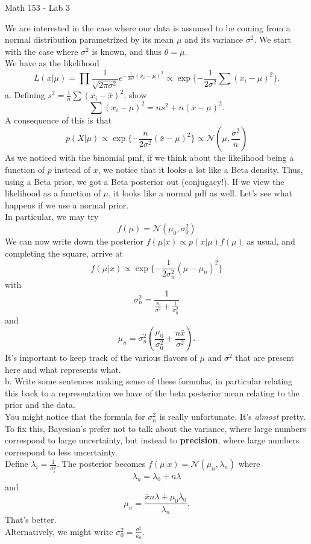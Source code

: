 \documentclass{article}
\begin{document}
\centerline{Math 153 - Lab 3}
\vspace{.1in}
We are interested in the case where our data is assumed to be coming from a normal distribution parametrized by its mean $\mu$ and its variance $\sigma^2$.  We start with the case where $\sigma^2$ is known, and thus $\theta=\mu$.\\
We have as the likelihood 
$$L(x|\mu)=\prod \frac{1}{\sqrt{2\pi\sigma^2}}e^{-\frac{1}{2\sigma^2}(x_i-\mu)^2}\propto \exp\{-\frac{1}{2\sigma^2}\sum (x_i-\mu)^2\}.$$
a.  Defining $s^2=\frac{1}{n}\sum(x_i-\bar{x})^2$, show $$\sum (x_i-\mu)^2=ns^2 + n(\bar{x}-\mu)^2.$$
A consequence of this is that 
$$p(X|\mu)\propto \exp\{-\frac{n}{2\sigma^2}(\bar{x}-\mu)^2\}\propto \mathcal{N}(\mu, \frac{\sigma^2}{n})$$
As we noticed with the binomial pmf, if we think about the likelihood being a function of $p$ instead of $x$, we notice that it looks a lot like a Beta density.  Thus, using a Beta prior, we got a Beta posterior out (conjugacy!).  If we view the likelihood as a function of $\mu$, it looks like a normal pdf as well.  Let's see what happens if we use a normal prior.\\
In particular, we may try 
$$f(\mu)=\mathcal{N}(\mu_0,\sigma_0^2)$$ 
We can now write down the posterior $f(\mu|x)\propto p(x|\mu)f(\mu)$ as usual, and completing the square, arrive at
$$f(\mu|x)\propto \exp\{-\frac{1}{2\sigma_n^2}(\mu-\mu_n)^2\}$$
with 
$$\sigma_n^2=\frac{1}{\frac{n}{\sigma^2}+\frac{1}{\sigma_0^2}}$$
and 
$$\mu_n=\sigma_n^2(\frac{\mu_0}{\sigma_0^2}+\frac{n\bar{x}}{\sigma^2}).$$
It's important to keep track of the various flavors of $\mu$ and $\sigma^2$ that are present here and what represents what.\\[10pt]
b.  Write some sentences making sense of these formulas, in particular relating this back to a representation we have of the beta posterior mean relating to the prior and the data.\\[10pt]
You might notice that the formula for $\sigma_n^2$ is really unfortunate.  It's {\it almost} pretty.  To fix this, Bayesian's prefer not to talk about the variance, where large numbers correspond to large uncertainty, but instead to {\bf precision}, where large numbers correspond to less uncertainty. \\
Define $\lambda_i=\frac{1}{\sigma_i^2}.$
The posterior becomes $f(\mu|x)= \mathcal{N}(\mu_n, \lambda_n)$ where 
$$\lambda_n=\lambda_0+n\lambda$$
and 
$$\mu_n=\frac{\bar{x}n\lambda +\mu_0\lambda_0}{\lambda_n}.$$
That's better. \\[10pt]
Alternatively, we might write $\sigma^2_0=\frac{\sigma^2}{\kappa_0}$.
\end{document}
